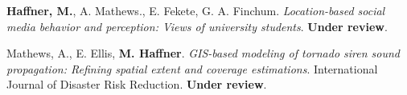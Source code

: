 




\begin{cventries}
   \cventry
      {}
      {}
      {}
      {}
      {
        \begin{cvitems}
          \vspace{-4mm}
        \item {\textbf{Haffner, M.}, A. Mathews., E. Fekete, G. A. Finchum.
            \textit{Location-based social media behavior and perception: Views
              of university students}. \textbf{Under review}.} \\
          \vspace{-2mm}
        \item
          {Mathews, A., E. Ellis, \textbf{M. Haffner}.
            \textit{GIS-based modeling of tornado siren sound propagation:
              Refining spatial extent and coverage estimations}. International
            Journal of Disaster Risk Reduction. \textbf{Under review}.} \\
        \end{cvitems}
    }
\end{cventries}


\vspace{-5mm}


